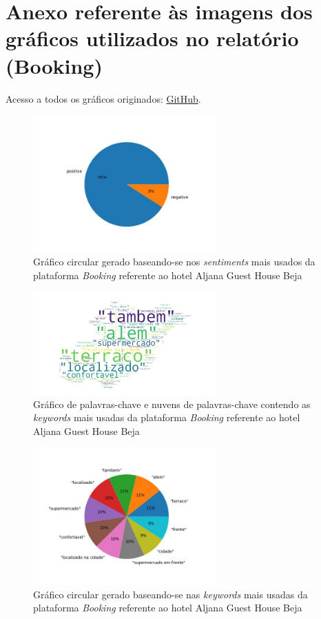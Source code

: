 \chapter{Anexo referente às imagens dos gráficos utilizados no relatório (Booking)}

Acesso a todos os gráficos originados: \href{https://github.com/CatKinKitKat/pi2021/tree/master/projecto/datascience/graphs/booking/hotels}{GitHub}.

\label{an4}
\begin{figure}[!htb]
\centering
\includegraphics[width=7cm]{figuras/Booking/hotel1_sentiments.jpeg}
\caption{Gráfico circular gerado baseando-se nos \textit{sentiments} mais usados da plataforma \textit{Booking} referente ao hotel Aljana Guest House Beja}
\label{fig:exemplofig}
\end{figure}

\begin{figure}[!htb]
\centering
\includegraphics[width=7cm]{figuras/Booking/hotel1_keywordcloud.jpeg}
\caption{Gráfico de palavras-chave e nuvens de palavras-chave contendo as \textit{keywords} mais usadas da plataforma \textit{Booking} referente ao hotel Aljana Guest House Beja}
\label{fig:exemplofig}
\end{figure}

\begin{figure}[!htb]
\centering
\includegraphics[width=7cm]{figuras/Booking/hotel1_keywords.jpeg}
\caption{Gráfico circular gerado baseando-se nas \textit{keywords} mais usadas da plataforma \textit{Booking} referente ao hotel Aljana Guest House Beja}
\label{fig:exemplofig}
\end{figure}

